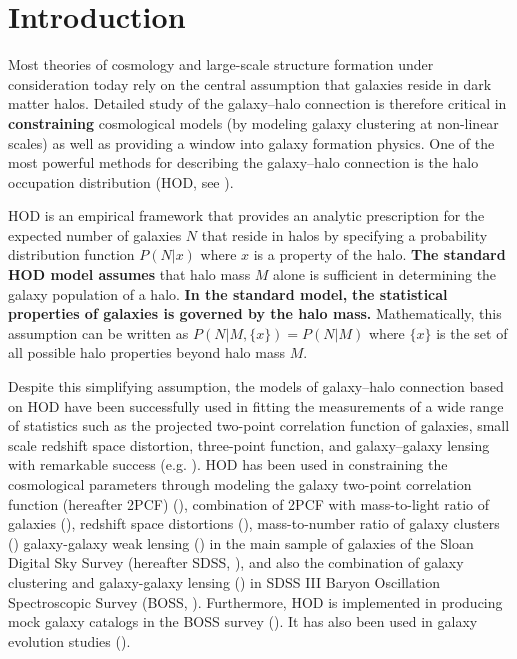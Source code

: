 \documentclass[twocolumn]{aastex61}
\begin{document}

\section{Introduction}
Most theories of cosmology and large-scale structure formation under consideration today rely on the central assumption that galaxies reside in dark matter halos. 
Detailed study of the galaxy--halo connection is therefore critical in {\bf \color{dred} constraining} cosmological models (by modeling galaxy clustering at non-linear scales) as well as providing a window into galaxy formation physics. 
One of the most powerful methods for describing the galaxy--halo connection is the halo occupation 
distribution (HOD, see \citealt{seljak2000, berlind_weinberg2002, scoccimarro2001, zheng2005, zheng07, leauthaud12, tinker2013, decorated, 2016arXiv160701782H}).

HOD is an empirical framework that provides an analytic prescription for the expected number of galaxies $N$ that reside in halos by specifying a probability distribution function $P(N|x)$ where $x$ is a property of the halo. 
{\bf \color{dred} The standard HOD model assumes} that halo mass $M$ alone is sufficient in determining the galaxy population of a halo. 
{\bf \color{dred} In the standard model,} {\bf \color{darkgreen} the statistical properties of galaxies is governed by the halo mass.}
Mathematically, this assumption can be written as $P(N|M,\{x\})=P(N|M)$ where $\{x\}$ is the set of all possible halo properties beyond halo mass $M$.

Despite this simplifying assumption, the models of galaxy--halo connection based on HOD have been successfully used in fitting the measurements of a wide range of statistics such as the projected two-point correlation function of galaxies, small scale redshift space distortion, three-point function, and galaxy--galaxy lensing with remarkable success (e.g. \citealt{zheng07,tinker_rsd2007,zehavi2011,leauthaud12,parejko2013,coupon2015,hod-3pcf,guo2015,miyatake15,zu2015,hod_vs_sham}). 
HOD has been used in constraining the cosmological parameters through modeling the galaxy two-point correlation function (hereafter 2PCF) (\citealt{abazajian2005}), combination of 2PCF with mass-to-light ratio of galaxies (\citealt{tinker05}), redshift space distortions (\citealt{tinker_rsd2007}), mass-to-number ratio of galaxy clusters (\citealt{tinker2012}) galaxy-galaxy weak lensing (\citealt{vdb03,cacciato13,more13,vdb13}) in the main sample of galaxies
of the Sloan Digital Sky Survey (hereafter SDSS, \citealt{york2000}), and also the combination of galaxy clustering and galaxy-galaxy lensing (\citealt{more15}) in SDSS III Baryon Oscillation Spectroscopic Survey (BOSS, \citealt{boss}). Furthermore, HOD is implemented in producing mock galaxy catalogs in the BOSS survey (\citealt{manera2013,white2014}). It has also been used in galaxy evolution studies (\citealt{conroy2009,leauthaud12,behroozi13,hudson2015,zu2015,zu2016}).
\end{document}
